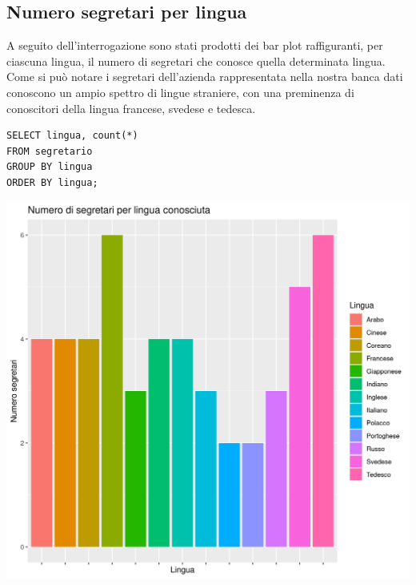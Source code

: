 \documentclass{article}
\begin{document}
\subsection{Numero segretari per lingua}
A seguito dell'interrogazione sono stati prodotti dei bar plot raffiguranti, per ciascuna lingua, il numero di segretari che conosce quella determinata lingua.
\newline
Come si può notare i segretari dell'azienda rappresentata nella nostra banca dati conoscono un ampio spettro di lingue straniere, con una preminenza di conoscitori della lingua francese, svedese e tedesca.
\begin{verbatim}
SELECT lingua, count(*) 
FROM segretario 
GROUP BY lingua 
ORDER BY lingua;
\end{verbatim}
\begin{center}
\includegraphics[width=\textwidth]{plot_numero_segretari_lingua.png}
\end{center}

\newpage
\end{document}
